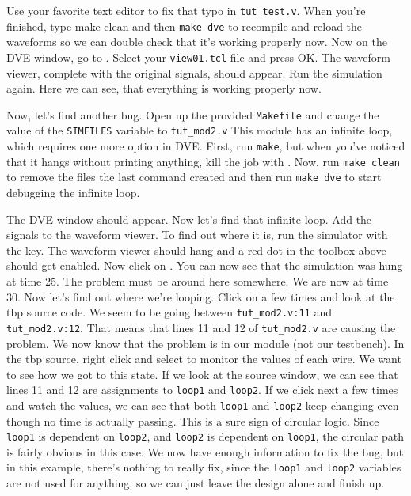 \documentclass[dvipsnames]{article}
\begin{document}
Use your favorite text editor to fix that typo in \texttt{tut\_test.v}. When 
you're finished, type make clean and then \texttt{make dve} to recompile and 
reload the waveforms so we can double check that it's working properly now. Now 
on the DVE window, go to . Select your
\texttt{view01.tcl} file and press OK. The waveform viewer, complete with the 
original signals, should appear. Run the simulation again. Here we can see, that
everything is working properly now. 

Now, let's find another bug. Open up the provided \texttt{Makefile} and change
the value of the \texttt{SIMFILES} variable to \texttt{tut\_mod2.v} This module
has an infinite loop, which requires one more option in DVE. First, run
\texttt{make}, but when you've noticed that it hangs without printing anything,
kill the job with \keys{\ctrl + $\backslash$}. Now, run \texttt{make clean} to
remove the files the last command created and then run \texttt{make dve} to
start debugging the infinite loop.

The DVE window should appear. Now let’s find that infinite loop. Add the signals
to the waveform viewer. To find out where it is, run the simulator with the
 key. The waveform viewer should hang and a red dot in the toolbox 
above should get enabled. Now click on . You can 
now see that the simulation was hung at time 25. The problem must be around here
somewhere. We are now at time 30. Now let’s find out where we’re looping. Click
on  a few times and look at the tbp source 
code. We seem to be going between \texttt{tut\_mod2.v:11} and
\texttt{tut\_mod2.v:12}. That means that lines 11 and 12 of \texttt{tut\_mod2.v}
are causing the problem. We now know that the problem is in our module (not our 
testbench). In the tbp source, right click and select  to 
monitor the values of each wire. We want to see how we got to this state. If we 
look at the source window, we can see that lines 11 and 12 are assignments to 
\texttt{loop1} and \texttt{loop2}. If we click next a few times and watch the 
values, we can see that both \texttt{loop1} and \texttt{loop2} keep changing 
even though no time is actually passing. This is a sure sign of circular logic.
Since \texttt{loop1} is dependent on \texttt{loop2}, and \texttt{loop2} is 
dependent on \texttt{loop1}, the circular path is fairly obvious in this case. 
We now have enough information to fix the bug, but in this example, there’s
nothing to really fix, since the \texttt{loop1} and \texttt{loop2} variables are
not used for anything, so we can just leave the design alone and finish up. 
\end{document}
